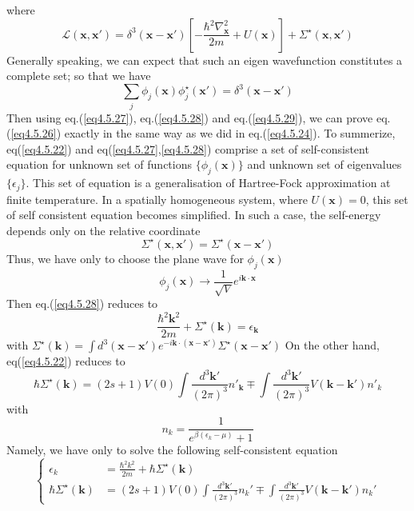 where
\begin{equation}\label{eq4.5.28}
\mathscr{L}(\mathbf{x},\mathbf{x}')=\delta^3(\mathbf{x}-\mathbf{x}')\left[ -\frac{\hbar^2\nabla^2_\mathbf{x}}{2m}+U(\mathbf{x}) \right]+ \Sigma^\star (\mathbf{x},\mathbf{x}')
\end{equation}
Generally speaking, we can expect that such an eigen wavefunction constitutes a complete set; so that we have 
\begin{equation}\label{eq4.5.29}
\sum_j\phi_j(\mathbf{x}) \phi_j^\star(\mathbf{x}')=\delta^3(\mathbf{x}-\mathbf{x}')
\end{equation}
Then using eq.(\ref{eq4.5.27}), eq.(\ref{eq4.5.28}) and eq.(\ref{eq4.5.29}), we can prove eq.(\ref{eq4.5.26}) exactly in the same way as we did in eq.(\ref{eq4.5.24}).
To summerize, eq(\ref{eq4.5.22}) and eq(\ref{eq4.5.27},\ref{eq4.5.28}) comprise a set of self-consistent equation for unknown set of functions $\{ \phi_j(\mathbf{x})\}$ and unknown set of eigenvalues $\{ \epsilon_j\}$.
This set of equation is a generalisation of Hartree-Fock approximation at finite temperature.
In a spatially homogeneous system, where $U(\mathbf{x})=0$, this set of self consistent equation becomes simplified.
In such a case, the self-energy depends only on the relative coordinate
\[
\Sigma^\star(\mathbf{x},\mathbf{x}')=\Sigma^\star(\mathbf{x}-\mathbf{x}')
\]
Thus, we have only to choose the plane wave for $\phi_j(\mathbf{x})$
\[
\phi_j(\mathbf{x})\rightarrow \frac{1}{\sqrt{V}}e^{i\mathbf{k} \cdot \mathbf{x}}
\]
Then eq.(\ref{eq4.5.28}) reduces to 
\begin{equation}
\frac{\hbar^2 \mathbf{k}^2}{2m}+\Sigma^\star (\mathbf{k})=\epsilon_{\mathbf{k}}
\end{equation}
with $\Sigma^\star (\mathbf{k})=\int d^3(\mathbf{x}-\mathbf{x}') e^{-i\mathbf{k}\cdot (\mathbf{x}-\mathbf{x'})} \Sigma^\star (\mathbf{x}-\mathbf{x}')$
On the other hand, eq(\ref{eq4.5.22}) reduces to 
\begin{equation}
\hbar \Sigma^\star (\mathbf{k})=(2s+1)V(0)\int \frac{d^3\mathbf{k}'}{(2\pi)^3} n'_\mathbf{k}\mp\int \frac{d^3\mathbf{k}'}{(2\pi)^3} V(\mathbf{k}-\mathbf{k}') n'_k
\end{equation}
with 
\begin{equation}\tag{4.5.30$^\prime$}
n_k=\frac{1}{e^{\beta(\epsilon_k-\mu)}+1}
\end{equation}
Namely, we have only to solve the following self-consistent equation
\begin{equation}\label{eq4.5.31}
\left\{
\begin{aligned}
\epsilon_k&=\frac{\hbar^2 k^2}{2m}+\hbar\Sigma^\star(\mathbf{k})\\
\hbar \Sigma^\star(\mathbf{k})&=(2s+1)V(0)\int\frac{d^3\mathbf{k}'}{(2\pi)^3}n_k'\mp\int\frac{d^3\mathbf{k}'}{(2\pi)^3}V(\mathbf{k}-\mathbf{k}')n_k'
\end{aligned}
\right.
\end{equation}
%




